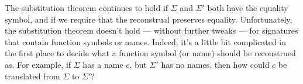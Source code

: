 

The substitution theorem continues to hold if $\Sigma$ and $\Sigma '$
both have the equality symbol, and if we require that the reconstrual
preserves equality.  Unfortunately, the substitution theorem doesn't
 hold --- without further tweaks --- for signatures that contain
 function symbols or names.  Indeed, it's a little bit complicated in
 the first place to decide what a function symbol (or name) should be
 reconstrued as.  For example, if $\Sigma$ has a name $c$, but
 $\Sigma '$ has no names, then how could $c$ be translated from
 $\Sigma$ to $\Sigma '$?

